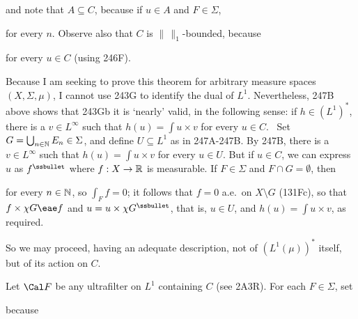 { 
      
\noindent and note that $A\subseteq C$, because if $u\in A$ and 
$F\in\Sigma$, 
      
      
\noindent for every $n$.   Observe also that $C$ is $\|\,\|_1$-bounded, 
because 
      
      
\noindent for every $u\in C$ (using 246F). 
      
\medskip 
      
 Because I am seeking to prove this theorem for 
arbitrary measure spaces $(X,\Sigma,\mu)$, I cannot use 243G to identify 
the dual of $L^1$.   Nevertheless, 247B above shows that 243Gb it is 
`nearly' valid, in the following 
sense:  if $h\in(L^1)^*$, there is a $v\in L^{\infty}$ such that 
$h(u)=\int u\times v$ for every $u\in C$.  \Prf\ Set 
$G=\bigcup_{n\in\Bbb N}E_n\in\Sigma$, and define $U\subseteq L^1$ as 
in 247A-247B.   By 247B, there is a $v\in L^{\infty}$ such that 
$h(u)=\int u\times v$ for every $u\in U$.   But if $u\in C$, 
we can express $u$ as $f^{\ssbullet}$ where $f:X\to\Bbb R$ is 
measurable.   If $F\in\Sigma$ and $F\cap G=\emptyset$, then 
      
      
\noindent for every $n\in\Bbb N$, so $\int_Ff=0$;  it follows that $f=0$ 
a.e.\ on $X\setminus G$ (131Fc), so that $f\times\chi G\eae f$ and 
$u=u\times\chi G^{\ssbullet}$, that is, $u\in U$, and 
$h(u)=\int u\times v$, as required. 
\Qed 
            
\medskip 
      
 So we may proceed, having an adequate description, not 
of $(L^1(\mu))^*$ itself, but of its action on $C$. 
      
Let $\Cal F$ be any ultrafilter on $L^1$ containing $C$ (see 2A3R). 
For each $F\in\Sigma$, set 
      
      
\noindent because 
      
      
}
